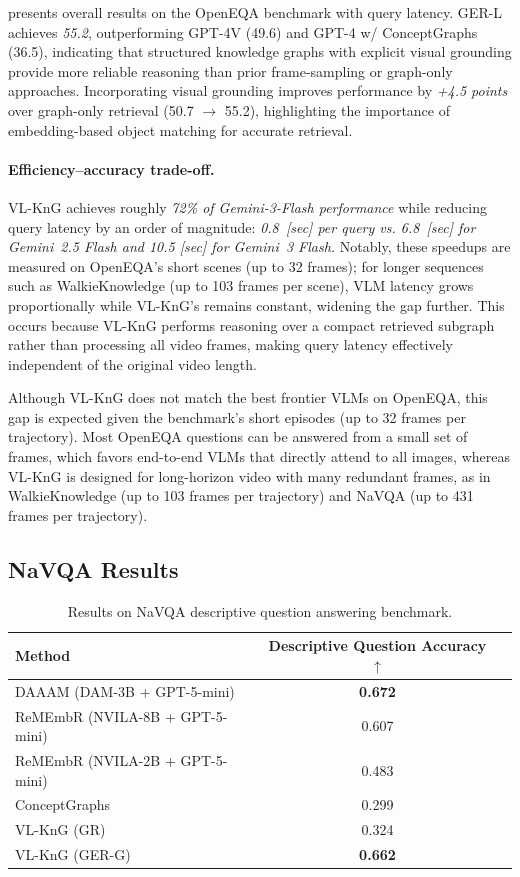 presents overall results on the OpenEQA benchmark with query latency.
GER-L achieves \textit{55.2}, outperforming GPT-4V (49.6) and GPT-4 w/ ConceptGraphs (36.5), indicating that structured knowledge graphs with explicit visual grounding provide more reliable reasoning than prior frame-sampling or graph-only approaches.
Incorporating visual grounding improves performance by \textit{+4.5 points} over graph-only retrieval (50.7 $\rightarrow$ 55.2), highlighting the importance of embedding-based object matching for accurate retrieval.

\paragraph{Efficiency--accuracy trade-off.}
VL-KnG achieves roughly \textit{72\% of Gemini-3-Flash performance} while reducing query latency by an order of magnitude: \textit{0.8~[sec] per query vs. 6.8~[sec] for Gemini~2.5 Flash and 10.5 [sec] for Gemini~3 Flash.}
Notably, these speedups are measured on OpenEQA's short scenes (up to 32 frames); for longer sequences such as WalkieKnowledge (up to 103 frames per scene), VLM latency grows proportionally while VL-KnG's remains constant, widening the gap further.
This occurs because VL-KnG performs reasoning over a compact retrieved subgraph rather than processing all video frames, making query latency effectively independent of the original video length.

Although VL-KnG does not match the best frontier VLMs on OpenEQA, this gap is expected given the benchmark's short episodes (up to 32 frames per trajectory).
Most OpenEQA questions can be answered from a small set of frames, which favors end-to-end VLMs that directly attend to all images, whereas VL-KnG is designed for long-horizon video with many redundant frames, as in WalkieKnowledge (up to 103 frames per trajectory) and NaVQA (up to 431 frames per trajectory).
\subsection{NaVQA Results}

\begin{table}[!h]
\centering
\caption{Results on NaVQA descriptive question answering benchmark.}
\label{tab:navqa_results}
\scriptsize
\setlength{\tabcolsep}{0.5pt}
\begin{tabular}{lcc}
\toprule
\textbf{Method} & \textbf{Descriptive Question Accuracy $\uparrow$} \\
\midrule
DAAAM (DAM-3B + GPT-5-mini) & \textbf{0.672} \\
ReMEmbR (NVILA-8B + GPT-5-mini) & 0.607 \\
ReMEmbR (NVILA-2B + GPT-5-mini) & 0.483 \\
ConceptGraphs & 0.299 \\
\midrule
VL-KnG (GR) & 0.324 \\
VL-KnG (GER-G) & \textbf{0.662} \\
\bottomrule
\end{tabular}
\end{table}

